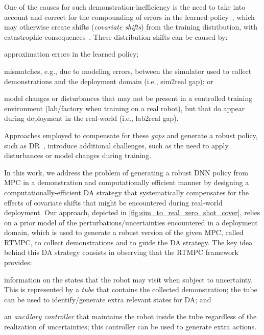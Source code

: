 One of the causes for such demonstration-inefficiency is the need to take into account and correct for the compounding of errors in the learned policy~\cite{ross2011reduction}, which may otherwise create shifts (\textit{covariate shifts}) from the training distribution, with catastrophic consequences~\cite{pomerleau1989alvinn}. These distribution shifts can be caused by: 
\begin{inparaenum}[(a)]
    \item approximation errors in the learned policy; 
    \item mismatches, e.g., due to modeling errors, between the simulator used to collect demonstrations and the deployment domain (i.e., sim2real gap); or
    \item model changes or disturbances that may not be present in a controlled training environment (lab/factory when training on a real robot), but that do appear during deployment in the real-world (i.e., lab2real gap).
\end{inparaenum} 
Approaches employed to compensate for these \textit{gaps} and generate a robust policy, such as \ac{DR}~\cite{peng2018sim, loquercio2019deep}, introduce additional challenges, such as the need to apply disturbances or model changes during training.
\par

In this work, we address the problem of generating a robust \ac{DNN} policy from \ac{MPC} in a demonstration and computationally efficient manner by designing a computationally-efficient \ac{DA} strategy that systematically compensates for the effects of covariate shifts that might be encountered during real-world deployment. Our approach, depicted in \cref{fig:sim_to_real_zero_shot_cover}, relies on a prior model of the perturbations/uncertainties encountered in a deployment domain, which is used to generate a robust version of the given \ac{MPC}, called \ac{RTMPC}, to collect demonstrations and to guide the \ac{DA} strategy. The key idea behind this \ac{DA} strategy consists in observing that the \ac{RTMPC} framework provides:
\begin{inparaenum}[(a)]
    \item information on the states that the robot may visit when subject to uncertainty. This is represented by a \textit{tube} that contains the collected demonstration; the tube can be used to identify/generate extra relevant states for \ac{DA}; and
    \item an \textit{ancillary controller} that maintains the robot inside the tube regardless of the realization of uncertainties; this controller can be used to generate extra actions.
\end{inparaenum}

